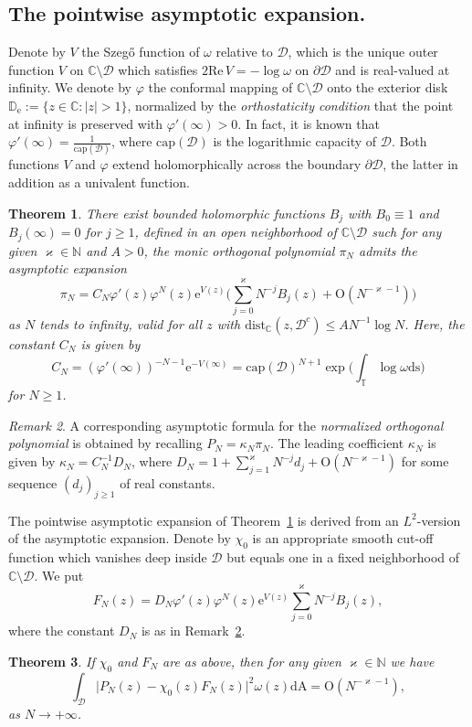 \documentclass{amsart}
\newcommand{\V}{V}
\newcommand{\be}{\begin{equation}}
\newcommand{\ee}{\end{equation}}
\newcommand{\C}{\mathbb{C}}
\newcommand{\D}{\mathbb{D}}
\newcommand{\T}{\mathbb{T}}
\newcommand{\N}{\mathbb{N}}
\newcommand{\calD}{\mathcal{D}}
\newcommand{\diffA}{\mathrm{dA}}
\newcommand{\diffs}{\mathrm{ds}}
\newtheorem{thm}{Theorem}[subsection]
\theoremstyle{definition}
\theoremstyle{remark}
\newtheorem{rem}[thm]{Remark}
\newcommand{\e}{\mathrm{e}}
\newcommand{\Ordo}{\mathrm{O}}
\renewcommand{\Re}{\mathrm{Re}\,}
\numberwithin{equation}{subsection}
\begin{document}
\medskip
\subsection{The pointwise asymptotic expansion.}
\label{ss:main}
Denote by $\V$ the Szeg\H{o}
function of $\omega$ relative to
$\calD$, which is the unique outer function $V$ on $\C\setminus\calD$
which satisfies $2\Re V=-\log \omega$ on $\partial\calD$ 
and is real-valued at infinity. 
We denote by $\varphi$ the conformal mapping
of $\C\setminus\calD$ onto the exterior disk $\D_\e:=\{z\in\C:|z|>1\}$, 
normalized by the {\em orthostaticity condition} that
the point at infinity is preserved with 
$\varphi'(\infty)>0$. In fact, it is known that 
$\varphi'(\infty)=\frac{1}{\mathrm{cap}(\calD)}$,
where $\mathrm{cap}(\calD)$ is the logarithmic capacity of $\calD$. 
Both functions $V$ and $\varphi$ 
extend holomorphically across the boundary $\partial\calD$, 
the latter in addition as a univalent function.

\begin{thm}
\label{thm:asymp-exp}
There exist bounded holomorphic functions $B_j$ with $B_0\equiv 1$
and $B_j(\infty)=0$ for $j\ge 1$,
defined in an open neighborhood of $\C\setminus\calD$
such for any given $\varkappa\in \N$ and $A>0$, the monic orthogonal 
polynomial $\pi_N$ admits the asymptotic expansion
\be\label{eq:asymp-exp-pol}
\pi_N=C_N\varphi'(z)\varphi^N(z)\e^{V(z)}
\Big(\sum_{j=0}^\varkappa N^{-j} B_j(z)+\Ordo(N^{-\varkappa-1})\Big)
\ee
as $N$ tends to infinity, valid for all $z$ with 
$\mathrm{dist}_\C(z,\calD^c)\le AN^{-1}\log N$. 
Here, the constant $C_N$ is given by
\be
C_N=(\varphi'(\infty))^{-N-1}\e^{-V(\infty)}=
\mathrm{cap}(\calD)^{N+1}
\exp\Big(\int_\T\log\omega\diffs\Big)
\ee
for $N\ge 1$.
\end{thm}

\begin{rem}\label{rem:monic-normalized}  
A corresponding asymptotic formula for 
the {\em normalized orthogonal polynomial}
is obtained by recalling $P_N=\kappa_N \pi_N$. 
The leading coefficient $\kappa_N$ is 
given by $\kappa_N=C_N^{-1}D_N$, where
$D_N=1+\sum_{j=1}^\varkappa N^{-j}d_j
+\Ordo(N^{-\varkappa-1})$
for some sequence $(d_j)_{j\ge1}$ of real constants.
\end{rem}

The pointwise asymptotic 
expansion of Theorem~\ref{thm:asymp-exp}
is derived from an $L^2$-version of the asymptotic expansion.
Denote by $\chi_0$ is an appropriate smooth cut-off function 
which vanishes deep inside $\calD$
but equals one in a fixed neighborhood of $\C\setminus \calD$.
We put 
\be
F_N(z)=D_N\varphi'(z)\varphi^N(z)\e^{V(z)} \sum_{j=0}^{\varkappa}N^{-j}B_j(z),
\ee
where the constant $D_N$ is as in Remark~\ref{rem:monic-normalized}.
\begin{thm}
\label{thm:asymp-exp-L2}
If $\chi_0$ and $F_N$ are as above, then for any given $\varkappa\in\N$ we have
\be
\int_{\calD}\big|P_N(z)-\chi_0(z)F_N(z)\big|^2\omega(z)\diffA=\Ordo(N^{-\varkappa-1}),
\ee
as $N\to+\infty$.
\end{thm}
\end{document}
